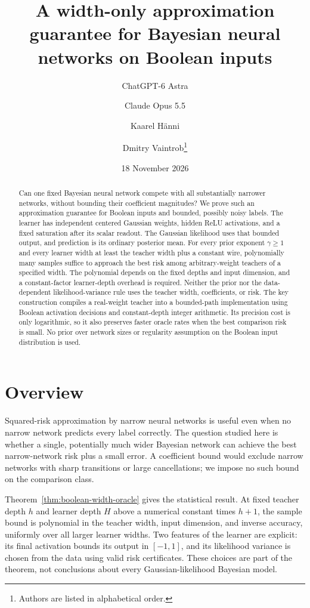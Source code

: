 \documentclass[11pt]{article}
\title{A width-only approximation guarantee for Bayesian neural networks on Boolean inputs}
\author{ChatGPT-6 Astra \and Claude Opus 5.5 \and Kaarel H\"anni \and Dmitry Vaintrob\thanks{Authors are listed in alphabetical order.}}
\date{18 November 2026}
\begin{document}
\maketitle
\begin{abstract}
Can one fixed Bayesian neural network compete with all substantially narrower networks, without bounding their coefficient magnitudes? We prove such an approximation guarantee for Boolean inputs and bounded, possibly noisy labels. The learner has independent centered Gaussian weights, hidden ReLU activations, and a fixed saturation after its scalar readout. The Gaussian likelihood uses that bounded output, and prediction is its ordinary posterior mean. For every prior exponent $\gamma\ge1$ and every learner width at least the teacher width plus a constant wire, polynomially many samples suffice to approach the best risk among arbitrary-weight teachers of a specified width. The polynomial depends on the fixed depths and input dimension, and a constant-factor learner-depth overhead is required. Neither the prior nor the data-dependent likelihood-variance rule uses the teacher width, coefficients, or risk. The key construction compiles a real-weight teacher into a bounded-path implementation using Boolean activation decisions and constant-depth integer arithmetic. Its precision cost is only logarithmic, so it also preserves faster oracle rates when the best comparison risk is small. No prior over network sizes or regularity assumption on the Boolean input distribution is used.
\end{abstract}

\section*{Overview}
Squared-risk approximation by narrow neural networks is useful even when no narrow network predicts every label correctly. The question studied here is whether a single, potentially much wider Bayesian network can achieve the best narrow-network risk plus a small error. A coefficient bound would exclude narrow networks with sharp transitions or large cancellations; we impose no such bound on the comparison class.

Theorem~\ref{thm:boolean-width-oracle} gives the statistical result. At fixed teacher depth $h$ and learner depth $H$ above a numerical constant times $h+1$, the sample bound is polynomial in the teacher width, input dimension, and inverse accuracy, uniformly over all larger learner widths. Two features of the learner are explicit: its final activation bounds its output in $[-1,1]$, and its likelihood variance is chosen from the data using valid risk certificates. These choices are part of the theorem, not conclusions about every Gaussian-likelihood Bayesian model.
\end{document}
